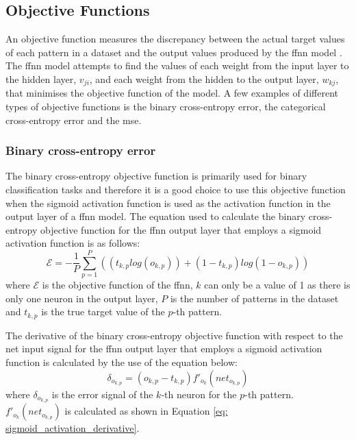 \documentclass[10pt, conference]{IEEEtran}
\begin{document}
\subsection{Objective Functions} \label{section: Obj_Func_background}

An objective function measures the discrepancy between the actual target values of each pattern in a dataset and the
output values produced by the \acrshort{ffnn} model \cite{objective_function_ref}. The \acrshort{ffnn} model attempts
to find the values of each weight from the input layer to the hidden layer, $v_{ji}$, and each weight from the hidden
to the output layer, $w_{kj}$, that minimises the objective function of the model. A few examples of different types
of objective functions is the binary cross-entropy error, the categorical cross-entropy error and the \acrfull{mse}.

\subsubsection{Binary cross-entropy error}

The binary cross-entropy objective function is primarily used for binary classification tasks and therefore it is a
good choice to use this objective function when the sigmoid activation function is used as the activation function
in the output layer of a \acrshort{ffnn} model. The equation used to calculate the binary cross-entropy objective
function for the \acrshort{ffnn} output layer that employs a sigmoid activation function is as follows:
\begin{equation}
    \mathcal{E} = - \frac{1}{P} \sum_{p=1}^{P} \left( (t_{k,p}log(o_{k,p})) + (1 - t_{k,p})log(1 - o_{k,p}) \right) \label{eq: bce_objective_function}
\end{equation}
where $\mathcal{E}$ is the objective function of the \acrshort{ffnn}, $k$ can only be a value of 1 as there is only
one neuron in the output layer, $P$ is the number of patterns in the dataset and $t_{k,p}$ is the true target value of the $p$-th
pattern.

The derivative of the binary cross-entropy objective function with respect to the net input signal for the \acrshort{ffnn} output
layer that employs a sigmoid activation function is calculated by the use of the equation below:
\begin{equation}
    \delta_{o_{k,p}} = (o_{k,p} - t_{k,p})f'_{o_k}(net_{o_{k,p}}) \label{eq: sigmoid_error_signal}
\end{equation}
where $\delta_{o_{k,p}}$ is the error signal of the $k$-th neuron for the $p$-th pattern.
$f'_{o_k}(net_{o_{k,p}})$ is calculated as shown in Equation \ref{eq: sigmoid_activation_derivative}.
\end{document}
